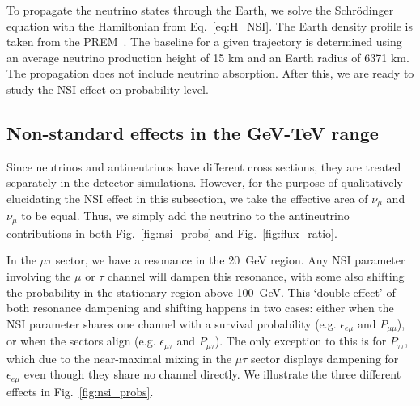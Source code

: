 \documentclass[draft=True]{revtex4-2}
\newcommand{\emt}{\ensuremath{\epsilon_{\mu\tau}}}
\newcommand{\eem}{\epsilon_{e\mu}}
\newcommand{\nm}{\nu_\mu}
\newcommand{\anm}{\bar\nu_\mu}
\begin{document}
To propagate the neutrino states through the Earth, we solve the Schrödinger equation with the Hamiltonian from Eq.~\ref{eq:H_NSI}. 
The Earth density profile is taken from the PREM~\cite{PREM}. The baseline for a given trajectory is determined using an average neutrino
production height of 15 km and an Earth radius of 6371 km. The propagation does not include neutrino absorption. After this, we are
ready to study the NSI effect on probability level.

\subsection{Non-standard effects in the GeV-TeV range}\label{sec:nsiEffects}
Since neutrinos and antineutrinos have different cross sections, they are treated separately in the detector simulations. 
However, for the purpose of qualitatively elucidating the NSI effect in this subsection, we take the effective area of $\nm$ and $\anm$ to be equal. 
Thus, we simply add the neutrino to the antineutrino contributions in both Fig.~\ref{fig:nsi_probs} and Fig.~\ref{fig:flux_ratio}.

In the $\mu\tau$ sector, we have a resonance in the \SI{20}{\GeV} region. Any NSI parameter involving the $\mu$ or $\tau$ channel will dampen this resonance,
with some also shifting the probability in the stationary region above \SI{100}{\GeV}.
This `double effect' of both resonance dampening and shifting happens in two cases: either when the NSI parameter shares one channel with a survival probability
(e.g. $\eem$ and $P_{\mu\mu}$), or when the sectors align (e.g. $\emt$ and $P_{\mu\tau}$). The only exception to this is for $P_{\tau\tau}$, 
which due to the near-maximal mixing in the $\mu\tau$ sector displays dampening for $\eem$ even though they share no channel directly. We illustrate
the three different effects in Fig.~\ref{fig:nsi_probs}. 
\end{document}
